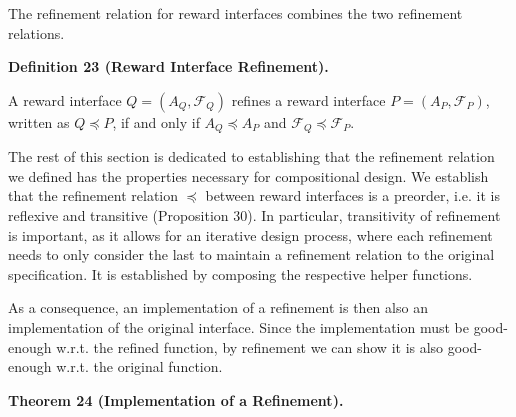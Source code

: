 \documentclass[10pt,a4paper]{article}
\begin{document}
 
 
 
The refinement relation for reward interfaces combines the two refinement relations.\par
 
 
 
\par\medskip\noindent\textbf{Definition 23 (Reward Interface Refinement).}\par
 
 
A reward interface $Q=(A_{Q},\mathcal{F}_{Q})$ refines a reward interface $P=(A_{P},\mathcal{F}_{P})$, written as $Q\preceq P$, if and only if $A_{Q}\preceq A_{P}$ and $\mathcal{F}_{Q}\preceq\mathcal{F}_{P}$.\par
 
 
 
 
The rest of this section is dedicated to establishing that the refinement relation we defined has the properties necessary for compositional design. We establish that the refinement relation $\preceq$ between reward interfaces is a preorder, i.e. it is reflexive and transitive (Proposition 30). In particular, transitivity of refinement is important, as it allows for an iterative design process, where each refinement needs to only consider the last to maintain a refinement relation to the original specification. It is established by composing the respective helper functions.\par
 
 
 
As a consequence, an implementation of a refinement is then also an implementation of the original interface. Since the implementation must be good-enough w.r.t. the refined function, by refinement we can show it is also good-enough w.r.t. the original function.\par
 
 
 
\par\medskip\noindent\textbf{Theorem 24 (Implementation of a Refinement).}\par
 
\end{document}
